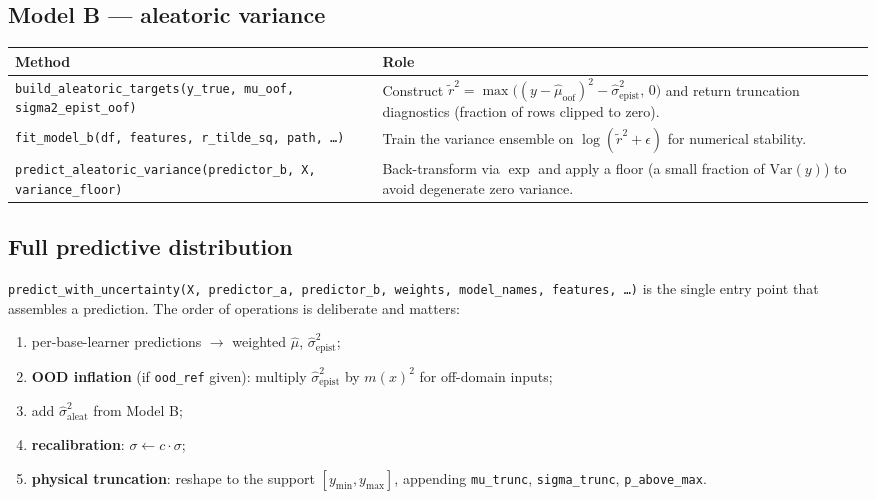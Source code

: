 \documentclass[11pt,a4paper]{article}
\newcommand{\code}[1]{\texttt{\small #1}}
\begin{document}
\subsection{Model B --- aleatoric variance}

\begin{longtable}{@{}p{}p{}@{}}
\toprule
\textbf{Method} & \textbf{Role} \\
\midrule
\endhead
\code{build\_aleatoric\_targets(y\_true, mu\_oof, sigma2\_epist\_oof)} &
  Construct $\tilde r^2 = \max\!\big((y-\hat\mu_{\text{oof}})^2 -
  \hat\sigma^2_{\text{epist}},\,0\big)$ and return truncation diagnostics
  (fraction of rows clipped to zero). \\
\code{fit\_model\_b(df, features, r\_tilde\_sq, path, \dots)} &
  Train the variance ensemble on $\log(\tilde r^2 + \epsilon)$ for numerical
  stability. \\
\code{predict\_aleatoric\_variance(predictor\_b, X, variance\_floor)} &
  Back-transform via $\exp$ and apply a floor (a small fraction of
  $\mathrm{Var}(y)$) to avoid degenerate zero variance. \\
\bottomrule
\end{longtable}

\subsection{Full predictive distribution}

\code{predict\_with\_uncertainty(X, predictor\_a, predictor\_b, weights,
model\_names, features, \dots)} is the single entry point that assembles a
prediction. The order of operations is deliberate and matters:

\begin{enumerate}[leftmargin=1.6em,itemsep=0.1em]
  \item per-base-learner predictions $\rightarrow$ weighted $\hat\mu$,
        $\hat\sigma^2_{\text{epist}}$;
  \item \textbf{OOD inflation} (if \code{ood\_ref} given): multiply
        $\hat\sigma^2_{\text{epist}}$ by $m(x)^2$ for off-domain inputs;
  \item add $\hat\sigma^2_{\text{aleat}}$ from Model B;
  \item \textbf{recalibration}: $\sigma \leftarrow c\cdot\sigma$;
  \item \textbf{physical truncation}: reshape to the support
        $[y_{\min},y_{\max}]$, appending \code{mu\_trunc},
        \code{sigma\_trunc}, \code{p\_above\_max}.
\end{enumerate}
\end{document}
